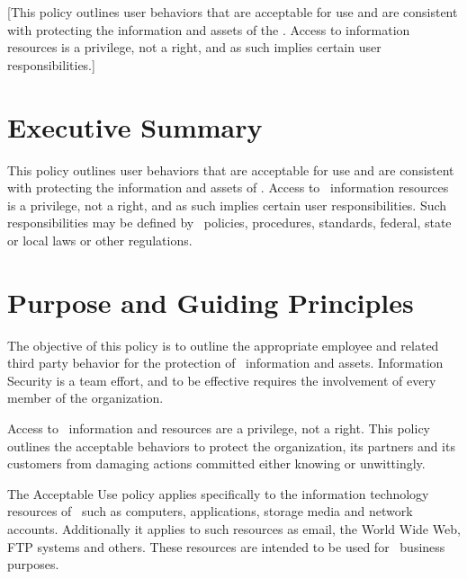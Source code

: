 \documentclass[use]{policy}
\begin{document}
	\begin{titlingpage}
		\maketitle
		
		\small [This policy outlines user behaviors that are acceptable for use and are consistent with protecting the information and assets of the \theOrganization.  Access to information resources is a privilege, not a right, and as such implies certain user responsibilities.]
		
	\end{titlingpage}

	\titleline

	\doctable
	
	
	\section{Executive Summary}
	
		This policy outlines user behaviors that are acceptable for use and are consistent with protecting the information and assets of \theOrganization.  Access to \theOrganization\ information resources is a privilege, not a right, and as such implies certain user responsibilities. Such responsibilities may be defined by \theOrganization\ policies, procedures, standards, federal, state or local laws or other regulations.
	
	
	\section{Purpose and Guiding Principles}
	
		The objective of this policy is to outline the appropriate employee and related third party behavior for the protection of \theOrganization\ information and assets. Information Security is a team effort, and to be effective requires the involvement of every member of the organization.
	
		Access to \theOrganization\  information and resources are a privilege, not a right.  This policy outlines the acceptable behaviors to protect the organization, its partners and its customers from damaging actions committed either knowing or unwittingly.
	
		The Acceptable Use policy applies specifically to the information technology resources of \theOrganization\  such as computers, applications, storage media and network accounts.  Additionally it applies to such resources as email, the World Wide Web, FTP systems and others.  These resources are intended to be used for \theOrganization\  business purposes.  
		
\end{document}
